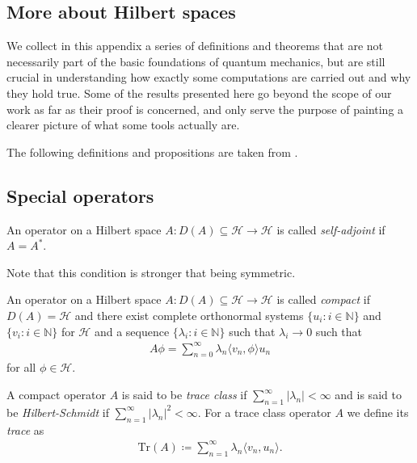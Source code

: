 \begin{appendices}

\chapter{More about Hilbert spaces}

We collect in this appendix a series of definitions and theorems that are not necessarily part
of the basic foundations of quantum mechanics, but are still crucial in understanding how
exactly some computations are carried out and why they hold true. Some of the results
presented here go beyond the scope of our work as far as their proof is concerned, and only
serve the purpose of painting a clearer picture of what some tools actually are.

The following definitions and propositions are taken from \cite{BlaBook}.

\section{Special operators}
\label{appendix:special-operators}

\begin{definition}
	An operator on a Hilbert space $A:D(A)\subseteq\mathcal{H}\to\mathcal{H}$ is called
	\textit{self-adjoint} if $A=A^*$.
\end{definition}

Note that this condition is stronger that being symmetric.

\begin{definition}
	An operator on a Hilbert space $A:D(A)\subseteq\mathcal{H}\to\mathcal{H}$ is called
	\textit{compact} if $D(A)=\mathcal{H}$ and there exist complete orthonormal systems
	$\{u_i:i\in\mathbb{N}\}$ and $\{v_i:i\in\mathbb{N}\}$ for $\mathcal{H}$ and a sequence
	$\{\lambda_i:i\in\mathbb{N}\}$ such that $\lambda_i \to 0$ such that
	\begin{align*}
		A\phi = \sum_{n=0}^\infty \lambda_n \langle v_n,\phi\rangle u_n
	\end{align*}
	for all $\phi\in\mathcal{H}$.
\end{definition}

\begin{definition}
	A compact operator $A$ is said to be \textit{trace class} if $\sum_{n=1}^\infty |\lambda_n| < \infty$
	and is said to be \textit{Hilbert-Schmidt} if $\sum_{n=1}^\infty |\lambda_n|^2 < \infty$.
	For a trace class operator $A$ we define its \textit{trace} as
	\begin{align*}
		\mathrm{Tr}(A) \coloneq \sum_{n=1}^\infty \lambda_n \langle v_n,u_n \rangle.
	\end{align*}
\end{definition}


\end{appendices}
